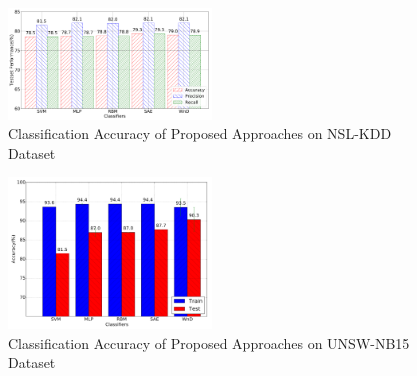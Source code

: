 \begin{figure}[h]
    \centering
    \includegraphics[width=0.48\textwidth]{figures/comp_accuracy_nsl.pdf}
    \caption{Classification Accuracy of Proposed Approaches on NSL-KDD Dataset}
    \label{Fig:CompAccuracyNSL}
\end{figure}

\begin{figure}[h]
    \centering
    \includegraphics[width=0.48\textwidth]{figures/comp_accuracy_unsw.pdf}
    \caption{Classification Accuracy of Proposed Approaches on UNSW-NB15 Dataset}
    \label{Fig:CompAccuracyUNSW}
\end{figure}

